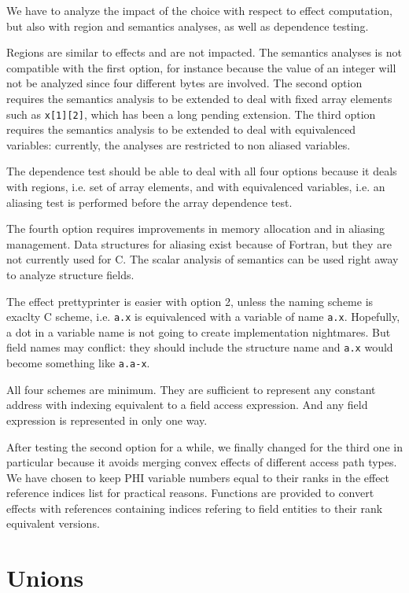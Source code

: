\documentclass[a4paper]{report}
\begin{document}
We have to analyze the impact of the choice with respect to effect
 computation, but also with region and semantics analyses, as well as
 dependence testing.

Regions are similar to effects and are not impacted. The semantics
 analyses is not compatible with the first option, for instance
 because the value of an integer will not be analyzed since four
 different bytes are involved. The second option requires the
 semantics analysis to be extended to deal with fixed array elements
 such as \verb/x[1][2]/, which has been a long pending extension. The
 third option requires the semantics analysis to be extended to deal
 with equivalenced variables: currently, the analyses are restricted
 to non aliased variables.

The dependence test should be able to deal with all four options
 because it deals with regions, i.e. set of array elements, and with
 equivalenced variables, i.e. an aliasing test is performed before the
 array dependence test.

The fourth option requires improvements in memory allocation and in
 aliasing management. Data structures for aliasing exist because of
 Fortran, but they are not currently used for C. The scalar analysis
 of semantics can be used right away to analyze structure fields.

The effect prettyprinter is easier with option 2, unless the naming
 scheme is exaclty C scheme, i.e. \verb/a.x/ is equivalenced with a
 variable of name \verb/a.x/. Hopefully, a dot in a variable name is
 not going to create implementation nightmares. But field names may
 conflict: they should include the structure name and \verb/a.x/ would
 become something like \verb/a.a-x/.

All four schemes are minimum. They are sufficient to represent any
 constant address with indexing equivalent to a field access
 expression. And any field expression is represented in only one way.

After testing the second option for a while, we finally changed for the third one in particular because it avoids merging convex effects of different access path types. We have chosen to keep PHI variable numbers equal to their ranks in the effect reference indices list for practical reasons. Functions are provided to convert effects with references containing indices refering to field entities to their rank equivalent versions.

\section{Unions}
\label{section:unions}
\end{document}
